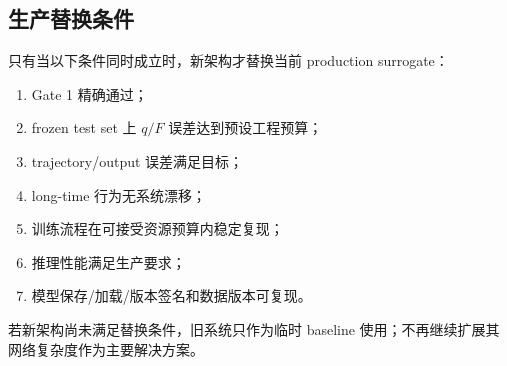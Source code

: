 \subsection{生产替换条件}
只有当以下条件同时成立时，新架构才替换当前 production surrogate：
\begin{enumerate}
  \item Gate 1 精确通过；
  \item frozen test set 上 $q/F$ 误差达到预设工程预算；
  \item trajectory/output 误差满足目标；
  \item long-time 行为无系统漂移；
  \item 训练流程在可接受资源预算内稳定复现；
  \item 推理性能满足生产要求；
  \item 模型保存/加载/版本签名和数据版本可复现。
\end{enumerate}

若新架构尚未满足替换条件，旧系统只作为临时 baseline 使用；不再继续扩展其网络复杂度作为主要解决方案。
